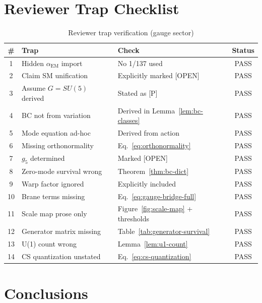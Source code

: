 \documentclass[11pt,a4paper]{article}
\begin{document}
\section{Reviewer Trap Checklist}
\label{sec:traps}

\begin{table}[h]
\centering
\caption{Reviewer trap verification (gauge sector)}
\label{tab:traps}
\begin{tabular}{clp{5cm}c}
\toprule
\# & Trap & Check & Status \\
\midrule
1 & Hidden $\alpha_{\text{EM}}$ import & No 1/137 used & PASS \\
2 & Claim SM unification & Explicitly marked [OPEN] & PASS \\
3 & Assume $G = SU(5)$ derived & Stated as [P] & PASS \\
4 & BC not from variation & Derived in Lemma~\ref{lem:bc-classes} & PASS \\
5 & Mode equation ad-hoc & Derived from action & PASS \\
6 & Missing orthonormality & Eq.~\eqref{eq:orthonormality} & PASS \\
7 & $g_5$ determined & Marked [OPEN] & PASS \\
8 & Zero-mode survival wrong & Theorem~\ref{thm:bc-dict} & PASS \\
9 & Warp factor ignored & Explicitly included & PASS \\
10 & Brane terms missing & Eq.~\eqref{eq:gauge-bridge-full} & PASS \\
11 & Scale map prose only & Figure~\ref{fig:scale-map} + thresholds & PASS \\
12 & Generator matrix missing & Table~\ref{tab:generator-survival} & PASS \\
13 & U(1) count wrong & Lemma~\ref{lem:u1-count} & PASS \\
14 & CS quantization unstated & Eq.~\eqref{eq:cs-quantization} & PASS \\
\bottomrule
\end{tabular}
\end{table}

\section{Conclusions}
\label{sec:conclusions}
\end{document}
